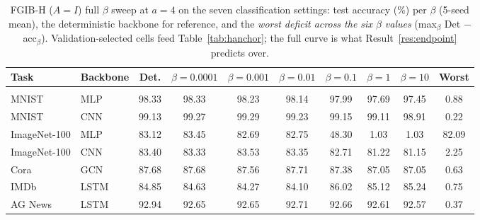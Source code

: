 \begin{table}[t]
\caption{FGIB-H ($A{=}I$) full $\beta$ sweep at $a{=}4$ on the seven classification settings: test accuracy (\%) per $\beta$ (5-seed mean), the deterministic backbone for reference, and the \emph{worst deficit across the six $\beta$ values} (max$_\beta$ Det $-$ acc$_\beta$). Validation-selected cells feed Table~\ref{tab:hanchor}; the full curve is what Result~\ref{res:endpoint} predicts over.}
\label{tab:hanchor-sweep-a4}
\begin{center}\footnotesize
\begin{tabular}{llcccccccc}
Task & Backbone & Det. & $\beta=0.0001$ & $\beta=0.001$ & $\beta=0.01$ & $\beta=0.1$ & $\beta=1$ & $\beta=10$ & Worst \\ \hline \\[-1.8ex]
MNIST & MLP & 98.33 & 98.33 & 98.23 & 98.14 & 97.99 & 97.69 & 97.45 & 0.88 \\
MNIST & CNN & 99.13 & 99.27 & 99.29 & 99.23 & 99.15 & 99.11 & 98.91 & 0.22 \\
ImageNet-100 & MLP & 83.12 & 83.45 & 82.69 & 82.75 & 48.30 & 1.03 & 1.03 & 82.09 \\
ImageNet-100 & CNN & 83.40 & 83.33 & 83.53 & 83.35 & 82.71 & 81.22 & 81.15 & 2.25 \\
Cora & GCN & 87.68 & 87.68 & 87.56 & 87.71 & 87.38 & 87.05 & 87.05 & 0.63 \\
IMDb & LSTM & 84.85 & 84.63 & 84.27 & 84.10 & 86.02 & 85.12 & 85.24 & 0.75 \\
AG News & LSTM & 92.94 & 92.65 & 92.65 & 92.71 & 92.66 & 92.61 & 92.57 & 0.37 \\
\end{tabular}\end{center}\end{table}


